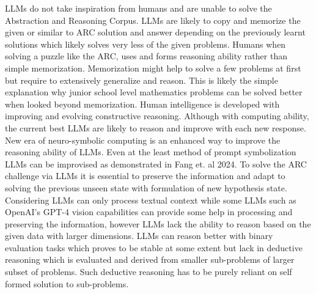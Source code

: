 \documentclass[pdflatex,sn-mathphys-num]{sn-jnl}%
\theoremstyle{thmstyleone}%
\theoremstyle{thmstyletwo}%
\theoremstyle{thmstylethree}%
\begin{document}
LLMs do not take inspiration from humans and are unable to solve the Abstraction and Reasoning Corpus\cite{opiełka2024largelanguagemodelssolve}. LLMs are likely to copy and memorize the given or similar to ARC solution and answer depending on the previously learnt solutions which likely solves very less of the given problems. Humans when solving a puzzle like the ARC, uses and forms reasoning ability rather than simple memorization. Memorization might help to solve a few problems at first but require to extensively generalize and reason. This is likely the simple explanation why junior school level mathematics problems can be solved better when looked beyond memorization. Human intelligence is developed with improving and evolving constructive reasoning\cite{Rinaldi2017IntelligenceAA}. Although with computing ability, the current best LLMs are likely to reason and improve with each new response. New era of neuro-symbolic computing is an enhanced way to improve the reasoning ability of LLMs. Even at the least method of prompt symbolization LLMs can be improvised as demonstrated in Fang et. al 2024\cite{fang2024large}. To solve the ARC challenge via LLMs it is essential to preserve the information and adapt to solving the previous unseen state with formulation of new hypothesis state. Considering LLMs can only process textual context while some LLMs such as OpenAI's GPT-4 vision capabilities can provide some help in processing and preserving the information, however LLMs lack the ability to reason based on the given data with larger dimensions. LLMs can reason better with binary evaluation tasks which proves to be stable at some extent but lack in deductive reasoning which is evaluated and derived from smaller sub-problems of larger subset of problems. Such deductive reasoning has to be purely reliant on self formed solution to sub-problems. 
\end{document}
